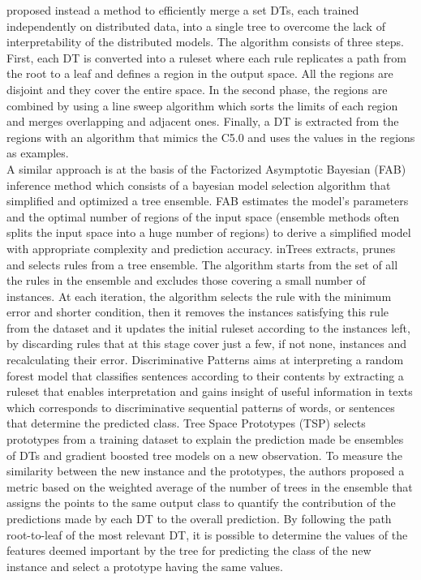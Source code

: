\documentclass[final,1p,times]{elsarticle}
\begin{document}
\cite{andrzejak2013interpretable} proposed instead a method to efficiently merge a set DTs, each trained independently on distributed data, into a single tree to overcome the lack of interpretability of the distributed models. The algorithm consists of three steps. First, each DT is converted into a ruleset where each rule replicates a path from the root to a leaf and defines a region in the output space. All the regions are disjoint and they cover the entire space. In the second phase, the regions are combined by using a line sweep algorithm which sorts the limits of each region and merges overlapping and adjacent ones. Finally, a DT is extracted from the regions with an algorithm that mimics the C5.0 and uses the values in the regions as examples. \\

A similar approach is at the basis of the Factorized Asymptotic Bayesian (FAB) inference method \cite{hara2018making} which consists of a bayesian model selection algorithm that simplified and optimized a tree ensemble.
FAB estimates the model's parameters and the optimal number of regions of the input space (ensemble methods often splits the input space into a huge number of regions) to derive a simplified model with appropriate complexity and prediction accuracy.
inTrees \cite{deng2018interpreting} extracts, prunes and selects rules from a tree ensemble. The algorithm starts from the set of all the rules in the ensemble and excludes those covering a small number of instances. At each iteration, the algorithm selects the rule with the minimum error and shorter condition, then it removes the instances satisfying this rule from the dataset and it updates the initial ruleset according to the instances left, by discarding rules that at this stage cover just a few, if not none, instances and recalculating their error.
Discriminative Patterns \cite{gao2017interpretable} aims at interpreting a random forest model that classifies sentences according to their contents by extracting a ruleset that enables interpretation and gains insight of useful information in texts which corresponds to discriminative sequential patterns of words, or sentences that determine the predicted class.
Tree Space Prototypes (TSP) \cite{tan2016tree} selects prototypes from a training dataset to explain the prediction made be ensembles of DTs and gradient boosted tree models on a new observation. 
To measure the similarity between the new instance and the prototypes, the authors proposed a metric based on the weighted average of the number of trees in the ensemble that assigns the points to the same output class to quantify the contribution of the predictions made by each DT to the overall prediction. By following the path root-to-leaf of the most relevant DT, it is possible to determine the values of the features deemed important by the tree for predicting the class of the new instance and select a prototype having the same values.
\end{document}
